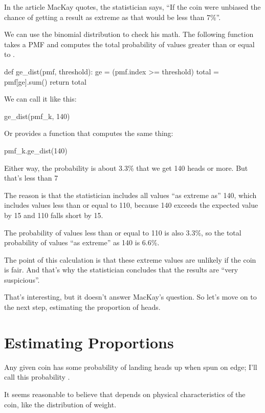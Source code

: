 \documentclass[12pt]{book}
\theoremstyle{exercise}
\begin{document}
In the article MacKay quotes, the statistician says, ``If the coin were unbiased the chance of getting a result as extreme as that would be less than 7\%''.

We can use the binomial distribution to check his math.  The following function takes a PMF and computes the total probability of values greater than or equal to . 

\begin{code}
def ge_dist(pmf, threshold):
    ge = (pmf.index >= threshold)
    total = pmf[ge].sum()
    return total
\end{code}

We can call it like this:

\begin{code}
ge_dist(pmf_k, 140)
\end{code}

Or  provides a function that computes the same thing:

\begin{code}
pmf_k.ge_dist(140)
\end{code}

Either way, the probability is about 3.3\% that we get 140 heads or more.
But that's less than 7%

The reason is that the statistician includes all values ``as extreme as'' 140, which includes values less than or equal to 110, because 140 exceeds the expected value by 15 and 110 falls short by 15.

The probability of values less than or equal to 110 is also 3.3\%,
so the total probability of values ``as extreme'' as 140 is 6.6\%.

The point of this calculation is that these extreme values are unlikely if the coin is fair.
And that's why the statistician concludes that the results are ``very suspicious''.

That's interesting, but it doesn't answer MacKay's question.  So let's move on to the next step, estimating the proportion of heads.


\section{Estimating Proportions}
\label{estprop}

Any given coin has some probability of landing heads up when spun
on edge; I'll call this probability .

It seems reasonable to believe that  depends
on physical characteristics of the coin, like the distribution
of weight.
\end{document}
